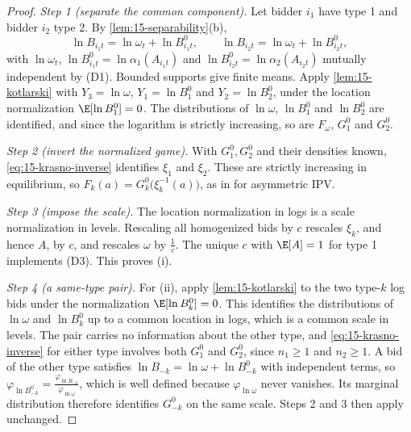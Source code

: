 \begin{proof}
\emph{Step 1 (separate the common component).} Let bidder $i_1$ have type 1 and bidder $i_2$ type 2. By
\cref{lem:15-separability}(b),
\[
\ln B_{i_1t}=\ln\omega_t+\ln B^0_{i_1t},\qquad \ln B_{i_2t}=\ln\omega_t+\ln B^0_{i_2t},
\]
with $\ln\omega_t$, $\ln B^0_{i_1t}=\ln\alpha_1(A_{i_1t})$ and $\ln B^0_{i_2t}=\ln\alpha_2(A_{i_2t})$
mutually independent by (D1). Bounded supports give finite means. Apply \cref{lem:15-kotlarski} with
$Y_3=\ln\omega$, $Y_1=\ln B^0_1$ and $Y_2=\ln B^0_2$, under the location normalization
$\E[\ln B^0_1]=0$. The distributions of $\ln\omega$, $\ln B^0_1$ and $\ln B^0_2$ are identified, and
since the logarithm is strictly increasing, so are $F_\omega$, $G^0_1$ and $G^0_2$.

\emph{Step 2 (invert the normalized game).} With $G^0_1,G^0_2$ and their densities known,
\eqref{eq:15-krasno-inverse} identifies $\xi_1$ and $\xi_2$. These are strictly increasing in
equilibrium, so $F_k(a)=G^0_k\big(\xi_k^{-1}(a)\big)$, as in \citet{LaffontVuong1996} for asymmetric
IPV.

\emph{Step 3 (impose the scale).} The location normalization in logs is a scale normalization in
levels. Rescaling all homogenized bids by $c$ rescales $\xi_k$, and hence $A$, by $c$, and rescales
$\omega$ by $\frac{1}{c}$. The unique $c$ with $\E[A]=1$ for type 1 implements (D3). This proves (i).

\emph{Step 4 (a same-type pair).} For (ii), apply \cref{lem:15-kotlarski} to the two type-$k$ log bids under the
normalization $\E[\ln B^0_k]=0$. This identifies the distributions of $\ln\omega$ and $\ln B^0_k$ up to a common
location in logs, which is a common scale in levels. The pair carries no information about the other type, and
\eqref{eq:15-krasno-inverse} for either type involves both $G^0_1$ and $G^0_2$, since $n_1\ge1$ and $n_2\ge1$.
A bid of the other type satisfies $\ln B_{-k}=\ln\omega+\ln B^0_{-k}$ with independent terms, so
$\varphi_{\ln B^0_{-k}}=\frac{\varphi_{\ln B_{-k}}}{\varphi_{\ln\omega}}$, which is well defined because
$\varphi_{\ln\omega}$ never vanishes. Its marginal distribution therefore identifies $G^0_{-k}$ on the same scale.
Steps 2 and 3 then apply unchanged.
\end{proof}

